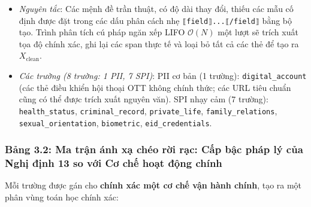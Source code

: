 \documentclass[
  11pt,
  a4paper,
]{article}
\providecommand{\tightlist}{%
  \setlength{\itemsep}{0pt}\setlength{\parskip}{0pt}}
\begin{document}
\begin{enumerate}
  \begin{itemize}
  \tightlist
  \item
    \emph{Nguyên tắc}: Các mệnh đề trần thuật, có độ dài thay đổi, thiếu
    các mẫu cố định được đặt trong các dấu phân cách nhẹ
    \texttt{⟦field⟧...⟦/field⟧} bằng bộ tạo. Trình phân tích cú pháp
    ngăn xếp LIFO \(\mathcal{O}(N)\) một lượt sẽ trích xuất tọa độ chính
    xác, ghi lại các span thực tế và loại bỏ tất cả các thẻ để tạo ra
    \(X_{\text{clean}}\).
  \item
    \emph{Các trường (8 trường: 1 PII, 7 SPI)}: PII cơ bản (1 trường):
    \texttt{digital\_account} (các thẻ điều khiển hội thoại OTT không
    chính thức; các URL tiêu chuẩn cũng có thể được trích xuất nguyên
    văn). SPI nhạy cảm (7 trường): \texttt{health\_status},
    \texttt{criminal\_record}, \texttt{private\_life},
    \texttt{family\_relations}, \texttt{sexual\_orientation},
    \texttt{biometric}, \texttt{eid\_credentials}.
  \end{itemize}
\end{enumerate}

\subsubsection{Bảng 3.2: Ma trận ánh xạ chéo rời rạc: Cấp bậc pháp lý
của Nghị định 13 so với Cơ chế hoạt động
chính}\label{bux1ea3ng-3.2-ma-trux1eadn-uxe1nh-xux1ea1-chuxe9o-rux1eddi-rux1ea1c-cux1ea5p-bux1eadc-phuxe1p-luxfd-cux1ee7a-nghux1ecb-ux111ux1ecbnh-13-so-vux1edbi-cux1a1-chux1ebf-houx1ea1t-ux111ux1ed9ng-chuxednh}

Mỗi trường được gán cho \textbf{chính xác một cơ chế vận hành chính},
tạo ra một phân vùng toán học chính xác:
\end{document}
